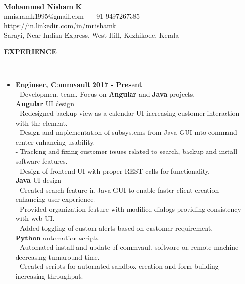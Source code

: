 \documentclass[a4paper,10pt]{article}
\newcommand{\lsep}{-0.5cm}
\newcommand{\resheading}[1]{{\small \colorbox{mygrey}{\begin{minipage}{0.975\textwidth}{\textbf{\uppercase{#1} \vphantom{p\^{E}}}}\end{minipage}}}}
\newcommand{\when}[1]{\hfill \textbf{#1}}
\newenvironment{noSepItemize}
{ \begin{itemize}
    \setlength{\itemsep}{1pt}
    \setlength{\parskip}{0pt}
    \setlength{\parsep}{0pt}     }
{ \end{itemize}                  }
\begin{document}
\hspace{0.5cm}\\[-0.2cm]

\begin{center}
\textbf{\Large{Mohammed Nisham K}} \\
mnishamk1995@gmail.com |\, +91 9497267385 |\, \href{https://in.linkedin.com/in/mnishamk}{https://in.linkedin.com/in/mnishamk}\\
Sarayi, Near Indian Express, West Hill, Kozhikode, Kerala \\
\end{center}

\resheading{\textbf{Experience} }\\[\lsep]
\begin{noSepItemize}
\item \noindent \textbf{Engineer, Commvault} \when{2017 - Present}
	\\ \indent - Development team. Focus on \textbf{Angular} and \textbf{Java} projects.
	\\ \indent \textbf{Angular} UI design
	\\ \indent \indent - Redesigned backup view as a calendar UI increasing customer interaction with the element.
	\\ \indent \indent - Design and implementation of subsystems from Java GUI into command center enhancing usability.
	\\ \indent \indent - Tracking and fixing customer issues related to search, backup and install software features.
	\\ \indent \indent - Design of frontend UI with proper REST calls for functionality.
	\\ \indent \textbf{Java} UI design
	\\ \indent \indent - Created search feature in Java GUI to enable faster client creation enhancing user experience.
	\\ \indent \indent - Provided organization feature with modified dialogs providing consistency with web UI.
	\\ \indent \indent - Added toggling of custom alerts based on customer requirement.
	\\ \indent \textbf{Python} automation scripts
	\\ \indent \indent - Automated install and update of commvault software on remote machine decreasing turnaround time. 
	\\ \indent \indent - Created scripts for automated sandbox creation and form building increasing throughput.

\end{noSepItemize}
\end{document}
